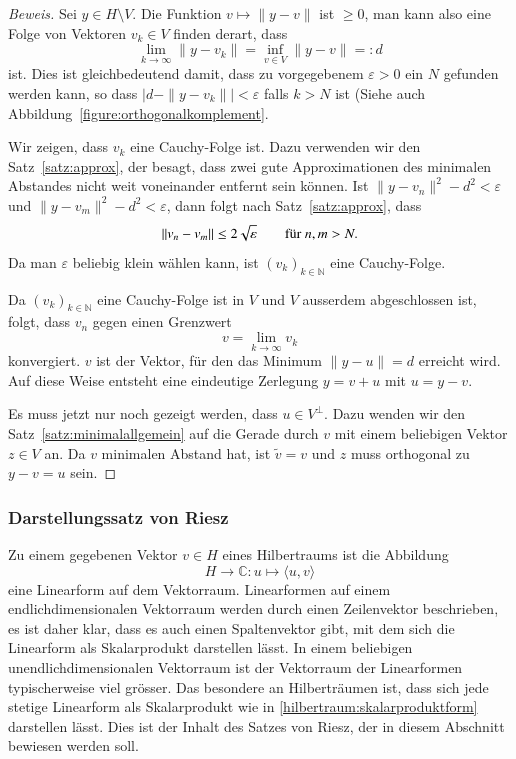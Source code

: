 \begin{proof}[Beweis]
Sei $y\in H\setminus V$.
Die Funktion $v\mapsto \|y-v\|$ ist $\ge 0$, man kann also eine
Folge von Vektoren $v_k\in V$ finden derart, dass
\[
\lim_{k\to\infty} \|y-v_k\| = \inf_{v\in V} \|y-v\| =: d
\]
ist.
Dies ist gleichbedeutend damit, dass zu vorgegebenem $\varepsilon>0$ ein
$N$ gefunden werden kann, so dass $|d- \|y-v_k\|| < \varepsilon$ falls
$k>N$ ist (Siehe auch Abbildung~\ref{figure:orthogonalkomplement}.

Wir zeigen, dass $v_k$ eine Cauchy-Folge ist.
Dazu verwenden wir den Satz~\ref{satz:approx}, der besagt, dass zwei
gute Approximationen des minimalen Abstandes nicht weit voneinander
entfernt sein können.
Ist
$\|y-v_n\|^2 - d^2  < \varepsilon$ 
und
$\|y-v_m\|^2 - d^2  < \varepsilon$,
dann folgt nach Satz~\ref{satz:approx}, dass
\[
\|v_n-v_m\|
\le 2\sqrt{\mathstrut\varepsilon}
\qquad
\text{für $n,m>N.$}
\]
Da man $\varepsilon$ beliebig klein wählen kann, ist $(v_k)_{k\in\mathbb N}$
eine Cauchy-Folge.

Da $(v_k)_{k\in\mathbb N}$ eine Cauchy-Folge ist in $V$ und $V$ ausserdem
abgeschlossen ist, folgt, dass $v_n$ gegen einen Grenzwert 
\[
v=\lim_{k\to\infty} v_k
\]
konvergiert.
$v$ ist der Vektor, für den das Minimum $\|y-u\|=d$ erreicht wird.
Auf diese Weise entsteht eine eindeutige Zerlegung $y = v + u$ mit $u=y-v$.

Es muss jetzt nur noch gezeigt werden, dass $u\in V^{\perp}$.
Dazu wenden wir den Satz~\ref{satz:minimalallgemein} auf die Gerade
durch $v$ mit einem beliebigen Vektor $z\in V$ an.
Da $v$ minimalen Abstand hat, ist $\tilde{v}=v$ und $z$ muss orthogonal
zu $y-v=u$ sein.
\end{proof}

\subsubsection{Darstellungssatz von Riesz
\label{subsubsection:riesz}}
Zu einem gegebenen Vektor $v\in H$ eines Hilbertraums ist die Abbildung
\begin{equation}
H\to\mathbb C
:
u\mapsto \langle u,v\rangle
\label{hilbertraum:skalarproduktform}
\end{equation}
eine Linearform auf dem Vektorraum.
Linearformen auf einem endlichdimensionalen Vektorraum werden durch
einen Zeilenvektor beschrieben, es ist daher klar, dass es auch einen
Spaltenvektor gibt, mit dem sich die Linearform als Skalarprodukt
darstellen lässt.
In einem beliebigen unendlichdimensionalen Vektorraum ist der Vektorraum
der Linearformen typischerweise viel grösser.
Das besondere an Hilberträumen ist, dass sich jede stetige Linearform
als Skalarprodukt wie in \eqref{hilbertraum:skalarproduktform}
darstellen lässt.
Dies ist der Inhalt des Satzes von Riesz, der in diesem Abschnitt
bewiesen werden soll.

